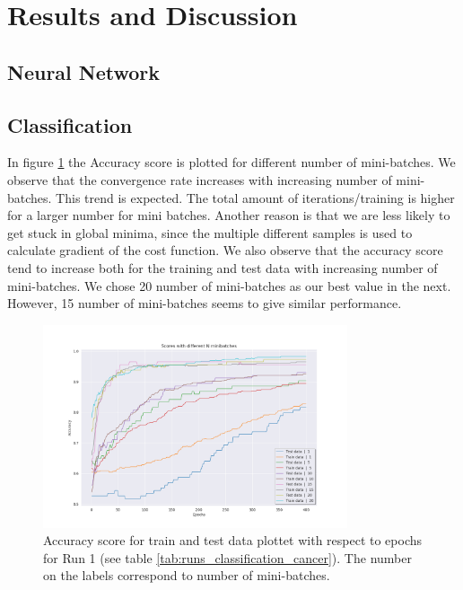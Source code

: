 \section{Results and Discussion}


\subsection{Neural Network}

\subsection{Classification}


%                              


In figure \ref{fig:d_line_batch_size} the Accuracy score is plotted for
different number of mini-batches. We observe that the convergence rate
increases with increasing number of mini-batches. This trend is expected. The
total amount of iterations/training is higher for a larger number for
mini batches. Another reason is that we are less likely to get stuck in global
minima, since the multiple different samples is used to calculate gradient of the
cost function. We also observe that the accuracy score tend to increase both
for the training and test data with increasing number of mini-batches.
We chose 20 number of mini-batches as our best value in the next. However, 15
number of mini-batches seems to give similar performance.    


\begin{figure}[H]
    \centering
    \includegraphics[width=0.8\textwidth]{Figures/PartD/d_line_batch_size.png}
    \caption{Accuracy score for train and test data plottet with respect to epochs for Run 1 (see table
    \ref{tab:runs_classification_cancer}). The number on the labels correspond
to number of mini-batches.}  
    \label{fig:d_line_batch_size} 
\end{figure}


